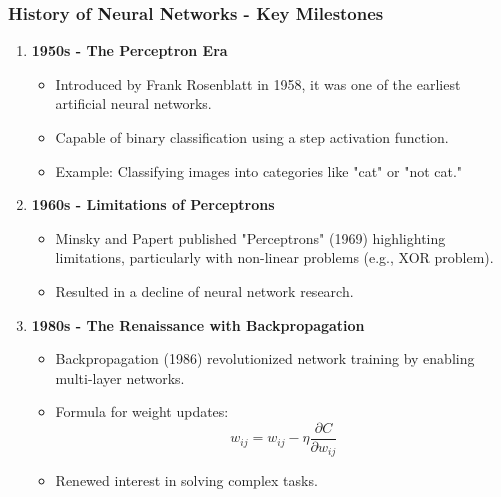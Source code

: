 \documentclass{beamer}
\begin{document}
\begin{frame}[fragile]
    \frametitle{History of Neural Networks - Key Milestones}
    \begin{enumerate}
        \item \textbf{1950s - The Perceptron Era}
            \begin{itemize}
                \item Introduced by Frank Rosenblatt in 1958, it was one of the earliest artificial neural networks.
                \item Capable of binary classification using a step activation function.
                \item Example: Classifying images into categories like "cat" or "not cat."
            \end{itemize}
        
        \item \textbf{1960s - Limitations of Perceptrons}
            \begin{itemize}
                \item Minsky and Papert published "Perceptrons" (1969) highlighting limitations, particularly with non-linear problems (e.g., XOR problem).
                \item Resulted in a decline of neural network research.
            \end{itemize}

        \item \textbf{1980s - The Renaissance with Backpropagation}
            \begin{itemize}
                \item Backpropagation (1986) revolutionized network training by enabling multi-layer networks.
                \item Formula for weight updates:
                \begin{equation}
                    w_{ij} = w_{ij} - \eta \frac{\partial C}{\partial w_{ij}}
                \end{equation}
                \item Renewed interest in solving complex tasks.
            \end{itemize}
    \end{enumerate}
\end{frame}
\end{document}
